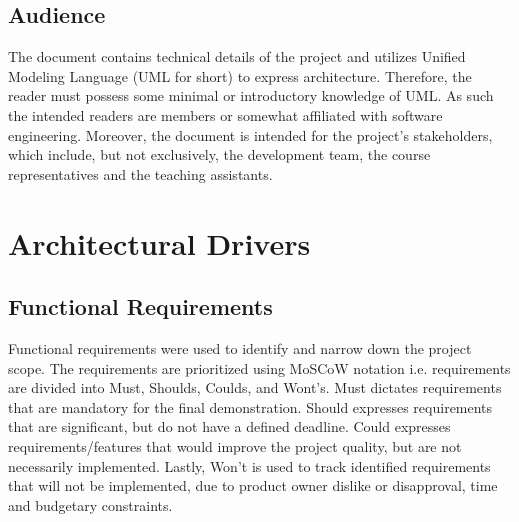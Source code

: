 \documentclass[12pt]{article}
\begin{document}
\subsection{Audience}
  The document contains technical details of the project and utilizes Unified Modeling Language (UML for short) to express architecture. Therefore, the reader must possess some minimal or introductory knowledge of UML. As such the intended readers are members or somewhat affiliated with software engineering. Moreover, the document is intended for the project’s stakeholders, which include, but not exclusively, the development team, the course representatives and the teaching assistants.
\pagebreak

\section{Architectural Drivers}
\subsection{Functional Requirements}
Functional requirements were used to identify and narrow down the project scope. The requirements are prioritized using MoSCoW notation i.e. requirements are divided into Must, Shoulds, Coulds, and Wont’s. Must dictates requirements that are mandatory for the final demonstration. Should expresses requirements that are significant, but do not have a defined deadline. Could expresses requirements/features that would improve the project quality, but are not necessarily implemented. Lastly, Won’t is used to track identified requirements that will not be implemented, due to product owner dislike or disapproval, time and budgetary constraints.\par
\end{document}
